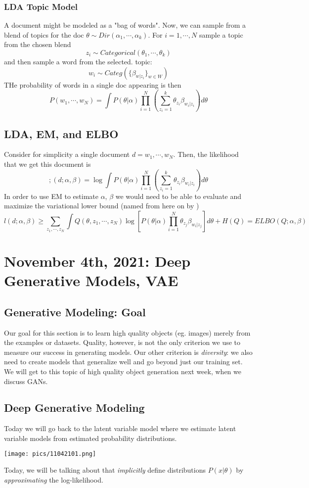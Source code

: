 \documentclass[11pt]{scrartcl}
\begin{document}
\subsubsection{LDA Topic Model}
A document might be modeled as a "bag of words". Now, we can sample from a blend of topics for the doc $\theta \sim Dir(\alpha_1,\cdots,\alpha_k)$. For $i=1,\cdots,N$ sample a topic from the chosen blend $$z_i \sim Categorical(\theta_1,\cdots,\theta_k)$$ and then sample a word from the selected. topic: $$w_i \sim Categ(\{\beta_{w|z_i}\}_{w \in W})$$ THe probability of words in a single doc appearing is then $$P(w_1,\cdots,w_{N})=\int P(\theta|\alpha)\prod_{i=1}^{N}\left(\sum_{z_i=1}^{k}\theta_{z_i}\beta_{w_i|z_i}\right)d\theta$$

\subsection{LDA, EM, and ELBO}
Consider for simplicity a single document $d=w_1,\cdots,w_{N}$. Then, the likelihood that we get this document is $$;(d;\alpha,\beta)=\log\int{P(\theta|\alpha)}\prod_{i=1}^{N}\left(\sum_{z_i=1}^{k}\theta_{z_i}\beta_{w_i|z_i}\right)d\theta$$
In order to use EM to estimate $\alpha$, $\beta$ we would need to be able to evaluate and maximize the variational lower bound (named from here on by )
$$l(d;\alpha,\beta) \ge \sum_{z_1,\cdots,z_{N}}\int Q(\theta,z_1,\cdots,z_{N})\log\left[P(\theta|\alpha)\prod_{i=1}^{N}\theta_{z_j}\beta_{w_i|z_j}\right]d\theta+H(Q)=ELBO(Q;\alpha,\beta)$$

\newpage

\section{November 4th, 2021: Deep Generative Models, VAE}

\subsection{Generative Modeling: Goal}
Our goal for this section is to learn high quality objects (eg. images) merely from the examples or datasets. Quality, however, is not the only criterion we use to measure our success in generating models. Our other criterion is \textit{diversity}: we also need to create models that generalize well and go beyond just our training set. We will get to this topic of high quality object generation next week, when we discuss GANs. 

\subsection{Deep Generative Modeling}
Today we will go back to the latent variable model where we estimate latent variable models from estimated probability distributions. 
\begin{center}
    \texttt{[image: pics/11042101.png]}
\end{center}
Today, we will be talking about  that  \textit{implicitly} define distributions $P(x|\theta)$ by \textit{approximating} the log-likelihood.
\end{document}
